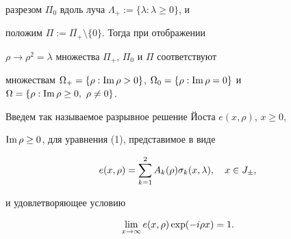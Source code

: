 разрезом $\Pi_0$ вдоль луча $\Lambda_{+}:=\{\lambda: \lambda\ge 0\}$, и


положим $\Pi:=\overline{\Pi_{+}}\setminus\{0\}$. Тогда при отображении


$\rho\to\rho^2=\lambda$ множества $\Pi_{+}$, $\Pi_{0}$ и $\Pi$ соответствуют


множествам $\Omega_{+}=\{\rho:\im \rho >0\}$, $\Omega_0=\{\rho:


\im \rho=0\}$ и $\Omega=\{\rho:\im\rho\ge 0,\ \rho\ne 0\}$.


Введем так называемое разрывное решение Йоста $e(x,\rho)$, $x\ge 0$,


$\operatorname{Im}\rho\ge 0$, для уравнения (1), представимое в виде


\begin{equation}


e(x,\rho)=


\sum_{k=1}^{2} A_k(\rho)\sigma_k(x,\la),\quad x\in J_{\pm},


\end{equation}


и удовлетворяющее условию


\begin{equation}


\lim_{x\to\iy} e(x,\rho)\exp(-i\rho x)=1.


\end{equation}






